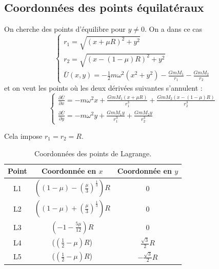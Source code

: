 \documentclass{beamer}
\begin{document}
	
	\subsection{Coordonnées des points équilatéraux}
	\begin{frame}
		On cherche des points d'équilibre pour $y \neq 0$. On a dans ce cas
		\begin{equation*}
			\label{equi_underived_eq}
			\begin{cases}
				r_1=\sqrt{(x+\mu R)^2+y^2}
				\\ r_2 = \sqrt{(x-(1-\mu)R)^2+y^2}
				\\ \bar{U}(x,y)=-\frac{1}{2}m\omega^2(x^2+y^2)-\frac{GmM_1}{r_1}-\frac{GmM_2}{r_2}
			\end{cases}
		\end{equation*}
		et on veut les points où les deux dérivées suivantes s'annulent :
		\begin{equation*}
			\label{equi_derived_eq}
			\begin{cases}
				\frac{\partial \bar{U}}{\partial x} = -m\omega^2x+\frac{GmM_1(x+\mu R)}{r_1^3}+\frac{GmM_2(x-(1-\mu)R)}{r_2^3}
				\\
				\frac{\partial \bar{U}}{\partial y} = -m\omega^2y+\frac{GmM_1y}{r_1^3}+\frac{GmM_2y}{r_2^3}
			\end{cases}
		\end{equation*}
		
		Cela impose $r_1 = r_2 = R$.
	\end{frame}
	
	\begin{frame}
		\begin{table}[H]
			\centering
			\label{tab:toutes_les_coord}
			\renewcommand{\arraystretch}{1.6}
			\begin{tabular}{|c|c|c|}
				\hline
				Point & Coordonnée en $x$ & Coordonnée en $y$
				\\ \hline
				L1 & $((1-\mu) - (\frac{\mu}{3})^{\frac{1}{3}})R$ & 0
				\\ \hline
				L2 & $((1-\mu) + (\frac{\mu}{3})^{\frac{1}{3}})R$ & 0
				\\ \hline
				L3 & $(-1-\frac{5\mu}{12})R$ & 0
				\\ \hline
				L4 & ($(\frac{1}{2}-\mu)R$) & $\frac{\sqrt{3}}{2}R$
				\\ \hline
				L5 & ($(\frac{1}{2}-\mu)R$) & $-\frac{\sqrt{3}}{2}R$
				\\ \hline
			\end{tabular}
			\caption{Coordonnées des points de Lagrange.}
		\end{table}	
	\end{frame}
	
\end{document}
